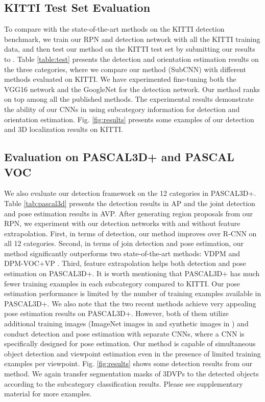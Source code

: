 \documentclass[10pt,twocolumn,letterpaper]{article}
\begin{document}
\subsection{KITTI Test Set Evaluation}

To compare with the state-of-the-art methods on the KITTI detection benchmark, we train our RPN and detection network with all the KITTI training data, and then test our method on the KITTI test set by submitting our results to \cite{KITTIObject}. Table \ref{table:test} presents the detection and orientation estimation results on the three categories, where we compare our method (SubCNN) with different methods evaluated on KITTI. We have experimented fine-tuning both the VGG16 network and the GoogleNet for the detection network. Our method ranks on top among all the published methods. The experimental results demonstrate the ability of our CNNs in using subcategory information for detection and orientation estimation. Fig. \ref{fig:results} presents some examples of our detection and 3D localization results on KITTI.

\subsection{Evaluation on PASCAL3D+ and PASCAL VOC}


We also evaluate our detection framework on the 12 categories in PASCAL3D+. Table \ref{tab:pascal3d} presents the detection results in AP and the joint detection and pose estimation results in AVP. After generating region proposals from our RPN, we experiment with our detection networks with and without feature extrapolation. First, in terms of detection, our method improves over R-CNN \cite{girshick2013rich} on all 12 categories. Second, in terms of join detection and pose estimation, our method significantly outperforms two state-of-the-art methods: VDPM \cite{xiang2014beyond} and DPM-VOC+VP \cite{bojan15pami}. Third, feature extrapolation helps both detection and pose estimation on PASCAL3D+. It is worth mentioning that PASCAL3D+ has much fewer training examples in each subcategory compared to KITTI. Our pose estimation performance is limited by the number of training examples available in PASCAL3D+. We also note that the two recent methods \cite{tulsiani2014viewpoints,su2015render} achieve very appealing pose estimation results on PASCAL3D+. However, both of them utilize additional training images (ImageNet images in \cite{tulsiani2014viewpoints} and synthetic images in \cite{su2015render}) and conduct detection and pose estimation with separate CNNs, where a CNN is specifically designed for pose estimation. Our method is capable of simultaneous object detection and viewpoint estimation even in the presence of limited training examples per viewpoint. Fig. \ref{fig:results} shows some detection results from our method. We again transfer segmentation masks of 3DVPs to the detected objects according to the subcategory classification results. Please see supplementary material for more examples.
\end{document}
